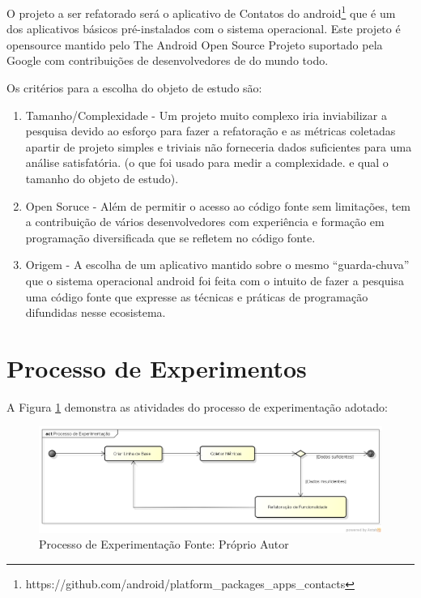 O projeto a ser refatorado será o aplicativo de Contatos do
android\footnote{https://github.com/android/platform_packages_apps_contacts} que
é um dos aplicativos básicos pré-instalados com o sistema operacional. Este projeto é opensource mantido pelo The Android Open Source Projeto suportado pela
Google com contribuições de desenvolvedores de do mundo todo.

Os critérios para a escolha do objeto de estudo são:

\begin{enumerate}
  \item Tamanho/Complexidade - Um projeto muito complexo iria inviabilizar a
  pesquisa devido ao esforço para fazer a refatoração e as métricas coletadas
  apartir de projeto simples e triviais não forneceria dados suficientes para
  uma análise satisfatória. (o que foi usado para medir a complexidade. e qual
  o tamanho do objeto de estudo).
  \item Open Soruce - Além de permitir o acesso ao código fonte sem limitações,
  tem a contribuição de vários desenvolvedores com experiência e formação em
  programação diversificada que se refletem no código fonte.
  \item Origem - A escolha de um aplicativo mantido sobre o mesmo
  ``guarda-chuva'' que o sistema operacional android foi feita com o intuito de
  fazer a pesquisa uma código fonte que expresse as técnicas e práticas de
  programação difundidas nesse ecosistema.
\end{enumerate}

\section{Processo de Experimentos}

A Figura \ref{processo_experimentacao} demonstra as atividades do processo de
experimentação adotado:
\begin{figure}[!h]
	\centering
	\includegraphics[scale=0.5]{img/processo_experimentacao.png}
	\caption{Processo de Experimentação Fonte: Próprio Autor}
	\label{processo_experimentacao}
\end{figure}

